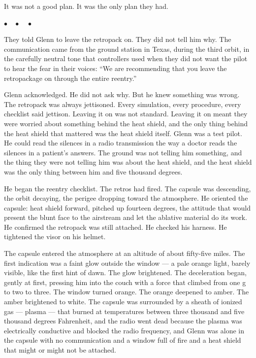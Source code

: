 \documentclass[12pt, letterpaper]{article}
\begin{document}
It was not a good plan. It was the only plan they had.

\begin{center}
$\bullet\quad\bullet\quad\bullet$
\end{center}

They told Glenn to leave the retropack on. They did not tell him why. The communication came from the ground station in Texas, during the third orbit, in the carefully neutral tone that controllers used when they did not want the pilot to hear the fear in their voices: ``We are recommending that you leave the retropackage on through the entire reentry.''

Glenn acknowledged. He did not ask why. But he knew something was wrong. The retropack was always jettisoned. Every simulation, every procedure, every checklist said jettison. Leaving it on was not standard. Leaving it on meant they were worried about something behind the heat shield, and the only thing behind the heat shield that mattered was the heat shield itself. Glenn was a test pilot. He could read the silences in a radio transmission the way a doctor reads the silences in a patient's answers. The ground was not telling him something, and the thing they were not telling him was about the heat shield, and the heat shield was the only thing between him and five thousand degrees.

He began the reentry checklist. The retros had fired. The capsule was descending, the orbit decaying, the perigee dropping toward the atmosphere. He oriented the capsule: heat shield forward, pitched up fourteen degrees, the attitude that would present the blunt face to the airstream and let the ablative material do its work. He confirmed the retropack was still attached. He checked his harness. He tightened the visor on his helmet.

The capsule entered the atmosphere at an altitude of about fifty-five miles. The first indication was a faint glow outside the window --- a pale orange light, barely visible, like the first hint of dawn. The glow brightened. The deceleration began, gently at first, pressing him into the couch with a force that climbed from one g to two to three. The window turned orange. The orange deepened to amber. The amber brightened to white. The capsule was surrounded by a sheath of ionized gas --- plasma --- that burned at temperatures between three thousand and five thousand degrees Fahrenheit, and the radio went dead because the plasma was electrically conductive and blocked the radio frequency, and Glenn was alone in the capsule with no communication and a window full of fire and a heat shield that might or might not be attached.
\end{document}
